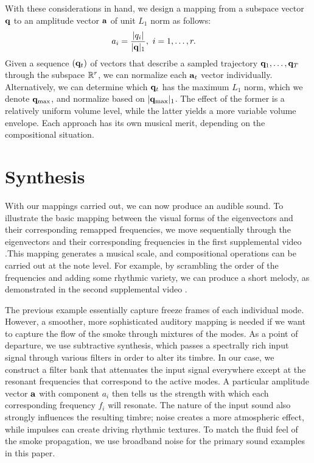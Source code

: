 \documentclass[11pt]{article}
\begin{document}
With these considerations in hand, we design a mapping from a subspace vector $\mathbf{q}$ to an amplitude vector $\mathbf{a}$ of unit $L_1$ norm as follows:
\begin{equation}
\begin{aligned}
a_i &= \frac{\lvert q_i \rvert}{\lvert\mathbf{q}\rvert_1}, \ i = 1, \ldots, r.
\end{aligned}
\end{equation}
Given a sequence $(\mathbf{q}_t)$ of vectors that describe a sampled trajectory $\mathbf{q}_1, \ldots, \mathbf{q}_T$ through the subspace $\mathbb{R}^r$, we can normalize each $\mathbf{a}_t$ vector individually. Alternatively, we can determine which $\mathbf{q}_t$ has the maximum $L_1$ norm, which we denote ${\mathbf{q}}_\textnormal{max}$, and normalize based on $\lvert\mathbf{q}_{\textnormal{max}}\rvert_1$. The effect of the former is a relatively uniform volume level, while the latter yields a more variable volume envelope. Each approach has its own musical merit, depending on the compositional situation.

\section*{Synthesis}

With our mappings carried out, we can now produce an audible sound. To illustrate the basic mapping between the visual forms of the eigenvectors and their corresponding remapped frequencies, we move sequentially through the eigenvectors and their corresponding frequencies in the first supplemental video \cite{sequential}.This mapping generates a musical scale, and compositional operations can be carried out at the note level. For example, by scrambling the order of the frequencies and adding some rhythmic variety, we can produce a short melody, as demonstrated in the second supplemental video \cite{melody}.


The previous example essentially capture freeze frames of each individual mode. However, a smoother, more sophisticated auditory mapping is needed if we want to capture the flow of the smoke through mixtures of the modes. As a point of departure, we use subtractive synthesis, which passes a spectrally rich input signal through various filters in order to alter its timbre. In our case, we construct a filter bank that attenuates the input signal everywhere except at the resonant frequencies that correspond to the active modes. A particular amplitude vector $\mathbf{a}$ with component $a_i$ then tells us the strength with which each corresponding frequency $f_i$ will resonate. The nature of the input sound also strongly influences the resulting timbre; noise creates a more atmospheric effect, while impulses can create driving rhythmic textures. To match the fluid feel of the smoke propagation, we use broadband noise for the primary sound examples in this paper.
\end{document}
